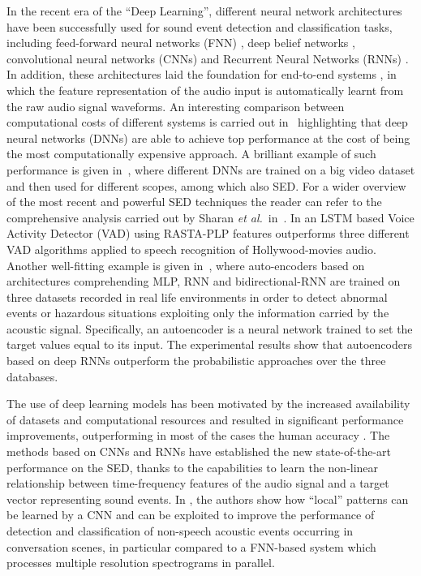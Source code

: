 In the recent era of the ``Deep Learning'', different neural network architectures have been successfully used for sound event detection and classification tasks, including feed-forward neural networks (FNN) \cite{mcloughlin2015robust}, deep belief networks \cite{mohamed2012acoustic}, convolutional neural networks (CNNs) \cite{piczak2015environmental} and Recurrent Neural Networks (RNNs) \cite{graves2013speech}. In addition, these architectures laid the foundation for end-to-end systems \cite{trigeorgis2016adieu, wu2017end}, in which the feature representation of the audio input is automatically learnt from the raw audio signal waveforms. An interesting comparison between computational costs of different systems is carried out in~\cite{sigtia2016automatic} highlighting that deep neural networks (DNNs) are able to achieve top performance at the cost of being the most computationally expensive approach. 
A brilliant example of such performance is given in~\cite{hershey2016cnn}, where different DNNs are trained on a big video dataset and then used for different scopes, among which also SED. For a wider overview of the most recent and powerful SED techniques the reader can refer to the comprehensive analysis carried out by Sharan \emph{et al.}\ in~\cite{sharan2016overview}.
In \cite{eyben2013real} an LSTM based Voice Activity Detector (VAD) using RASTA-PLP features outperforms three different VAD algorithms applied to speech recognition of Hollywood-movies audio.
Another well-fitting example is given in~\cite{marchi2017deep}, where auto-encoders based on architectures comprehending MLP, RNN and bidirectional-RNN are trained on three datasets recorded in real life environments in order to detect abnormal events or hazardous situations exploiting only the information carried by the acoustic signal. Specifically, an autoencoder is a neural network trained to set the target values equal to its input.
The experimental results show that autoencoders based on deep RNNs outperform the probabilistic approaches over the three databases. 

The use of deep learning models has been motivated by the increased availability of datasets and computational resources and resulted in significant performance improvements, outperforming in most of the cases the human accuracy \cite{sailor2017unsupervised}.
The methods based on CNNs and RNNs have established the new state-of-the-art performance on the SED, thanks to the capabilities to learn the non-linear relationship between time-frequency features of the audio signal and a target vector representing sound events. In \cite{espi2015}, the authors show how ``local'' patterns can be learned by a CNN and can be exploited to improve the performance of detection and classification of non-speech acoustic events occurring in conversation scenes, in particular compared to a FNN-based system which processes multiple resolution spectrograms in parallel. 

